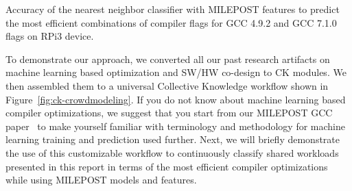   \begin{table}[!htbp]
    \centering
    \caption{
     Accuracy of the nearest neighbor classifier with MILEPOST features 
     to predict the most efficient combinations of compiler flags 
     for GCC 4.9.2 and GCC 7.1.0 flags on RPi3 device.
    }
    \label{fig:crowdmodeling-milepost-all-rpi3-progs}
  \end{table}

To demonstrate our approach, we converted all our past research artifacts 
on machine learning based optimization and SW/HW co-design
to CK modules.
%
We then assembled them to a universal Collective Knowledge workflow 
shown in Figure~\ref{fig:ck-crowdmodeling}.
%
If you do not know about machine learning based compiler optimizations, 
we suggest that you start from our MILEPOST GCC paper~\cite{29db2248aba45e59:a31e374796869125}
to make yourself familiar with terminology 
and methodology for machine learning training 
and prediction used further.
%
Next, we will briefly demonstrate the use of this customizable workflow 
to continuously classify shared workloads presented in this report 
in terms of the most efficient compiler optimizations
while using MILEPOST models and features.

